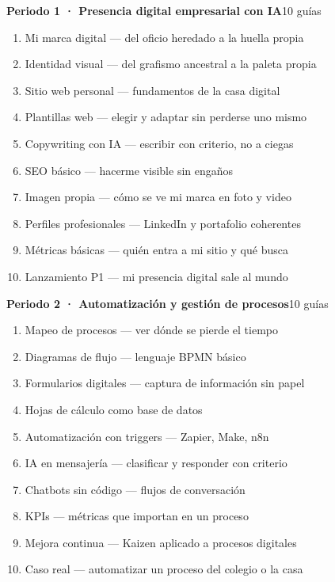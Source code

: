 \bigskip
{}
\vspace{1pt}\par\noindent{\color{vinoInst}\rule{\textwidth}{1pt}}
\vspace{3pt}

\noindent\textbf{Periodo 1 · Presencia digital empresarial con IA}\hfill{\footnotesize\color{vinoInst}10 guías}\par
\begin{enumerate}[leftmargin=2.6em, itemsep=0.6pt, topsep=2pt, parsep=0pt, label=\footnotesize\arabic*.]
\footnotesize
  \item Mi marca digital --- del oficio heredado a la huella propia
  \item Identidad visual --- del grafismo ancestral a la paleta propia
  \item Sitio web personal --- fundamentos de la casa digital
  \item Plantillas web --- elegir y adaptar sin perderse uno mismo
  \item Copywriting con IA --- escribir con criterio, no a ciegas
  \item SEO básico --- hacerme visible sin engaños
  \item Imagen propia --- cómo se ve mi marca en foto y video
  \item Perfiles profesionales --- LinkedIn y portafolio coherentes
  \item Métricas básicas --- quién entra a mi sitio y qué busca
  \item Lanzamiento P1 --- mi presencia digital sale al mundo
\end{enumerate}

\noindent\textbf{Periodo 2 · Automatización y gestión de procesos}\hfill{\footnotesize\color{vinoInst}10 guías}\par
\begin{enumerate}[leftmargin=2.6em, itemsep=0.6pt, topsep=2pt, parsep=0pt, label=\footnotesize\arabic*.]
\footnotesize
  \item Mapeo de procesos --- ver dónde se pierde el tiempo
  \item Diagramas de flujo --- lenguaje BPMN básico
  \item Formularios digitales --- captura de información sin papel
  \item Hojas de cálculo como base de datos
  \item Automatización con triggers --- Zapier, Make, n8n
  \item IA en mensajería --- clasificar y responder con criterio
  \item Chatbots sin código --- flujos de conversación
  \item KPIs --- métricas que importan en un proceso
  \item Mejora continua --- Kaizen aplicado a procesos digitales
  \item Caso real --- automatizar un proceso del colegio o la casa
\end{enumerate}

